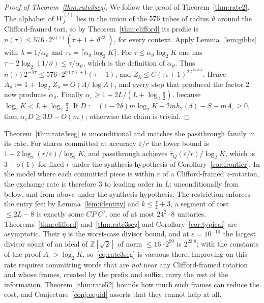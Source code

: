 \documentclass[aps,prx,twocolumn,superscriptaddress,nofootinbib,longbibliography]{revtex4-2}
\theoremstyle{plain}
\theoremstyle{definition}
\theoremstyle{remark}
\newcommand{\Z}{\mathbb{Z}}
\begin{document}
\begin{proof}[Proof of Theorem~\ref{thm:rate3seg}]
We follow the proof of Theorem~\ref{thm:rate2}. The alphabet of $\overline W^{(t)}_j$ lies in the union of the $576$ tubes of radius $\vartheta$ around the Clifford-framed tori, so by Theorem~\ref{thm:clifford} its profile is $n(\tau)\le576\cdot2^{\eta(\tau)}(\tau+1+\vartheta^22^\tau)$, for every context. Apply Lemma~\ref{lem:gibbs} with $\lambda=1/\alpha_\vartheta$ and $\tau_*=\lceil\alpha_\vartheta\log_2K\rceil$. For $\tau\le\alpha_\vartheta\log_2K$ one has $\tau-2\log_2(1/\vartheta)\le\tau/\alpha_\vartheta$, which is the definition of $\alpha_\vartheta$. Thus $n(\tau)2^{-\lambda\tau}\le576\cdot2^{\eta(\tau)+1}(\tau+1)$, and $Z_\lambda\le C(\tau_*+1)^22^{\max\eta}$. Hence $A_\vartheta:=1+\log_2Z_\lambda=O(\Lambda/\log\Lambda)$, and every step that produced the factor $2$ now produces $\alpha_\vartheta$. Finally $\alpha_\varepsilon\ge1+2L/(L+\log_2\frac\pi2)$, because $\log_2K<L+\log_2\frac\pi2$. If $D:=(1-2\delta)m\log_2K-2mh_2(\delta)-S-mA_\varepsilon\ge0$, then $\alpha_\varepsilon D\ge3D-O(m)$; otherwise the claim is trivial.
\end{proof}
Theorem~\ref{thm:rate3seg} is unconditional and matches the passthrough family in its rate. For shares committed at accuracy $\varepsilon/r$ the lower bound is $1+2\log_2(r/\varepsilon)/\log_2K$, and passthrough achieves $\bar\tau_Q(\varepsilon/r)/\log_2K$, which is $3+o(1)$ for fixed $r$ under the synthesis hypothesis of Corollary~\ref{cor:frontier}. In the model where each committed piece is within $\varepsilon$ of a Clifford-framed $z$-rotation, the exchange rate is therefore $3$ to leading order in $L$: unconditionally from below, and from above under the synthesis hypothesis. The restriction enforces the entry fee: by Lemma~\ref{lem:identity} and $k\le\tfrac\tau2+3$, a segment of cost $\le2L-8$ is exactly some $CT^jC'$, one of at most $24^2\cdot8$ unitaries. Theorems~\ref{thm:clifford} and~\ref{thm:rate3seg} and Corollary~\ref{cor:typical} are asymptotic. Their $\eta$ is the worst-case divisor bound, and at $\varepsilon=10^{-10}$ the largest divisor count of an ideal of $\Z[\sqrt2]$ of norm $\le16\cdot2^{99}$ is $2^{22.8}$; with the constants of the proof $A_\varepsilon>\log_2K$, so~\eqref{eq:rate3seg} is vacuous there. Improving on this rate requires committing words that are \emph{not} near any Clifford-framed rotation and whose frames, created by the prefix and suffix, carry the rest of the information. Theorem~\ref{thm:rate52} bounds how much such frames can reduce the cost, and Conjecture~\ref{conj:equid} asserts that they cannot help at all.
\end{document}
